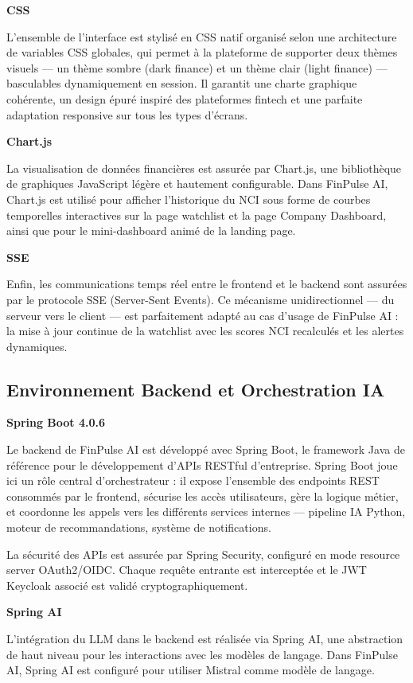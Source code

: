 \textbf{CSS}

L'ensemble de l'interface est stylisé en CSS natif organisé selon une architecture de variables CSS globales, qui permet à la plateforme de supporter deux thèmes visuels — un thème sombre (dark finance) et un thème clair (light finance) — basculables dynamiquement en session. Il garantit une charte graphique cohérente, un design épuré inspiré des plateformes fintech et une parfaite adaptation responsive sur tous les types d'écrans.

\textbf{Chart.js}

La visualisation de données financières est assurée par Chart.js, une bibliothèque de graphiques JavaScript légère et hautement configurable. Dans FinPulse AI, Chart.js est utilisé pour afficher l'historique du NCI sous forme de courbes temporelles interactives sur la page watchlist et la page Company Dashboard, ainsi que pour le mini-dashboard animé de la landing page.

\textbf{SSE}

Enfin, les communications temps réel entre le frontend et le backend sont assurées par le protocole SSE (Server-Sent Events). Ce mécanisme unidirectionnel — du serveur vers le client — est parfaitement adapté au cas d'usage de FinPulse AI : la mise à jour continue de la watchlist avec les scores NCI recalculés et les alertes dynamiques.

\subsection{Environnement Backend et Orchestration IA}

\textbf{Spring Boot 4.0.6}

Le backend de FinPulse AI est développé avec Spring Boot, le framework Java de référence pour le développement d'APIs RESTful d'entreprise. Spring Boot joue ici un rôle central d'orchestrateur : il expose l'ensemble des endpoints REST consommés par le frontend, sécurise les accès utilisateurs, gère la logique métier, et coordonne les appels vers les différents services internes — pipeline IA Python, moteur de recommandations, système de notifications.

La sécurité des APIs est assurée par Spring Security, configuré en mode resource server OAuth2/OIDC. Chaque requête entrante est interceptée et le JWT Keycloak associé est validé cryptographiquement.

\textbf{Spring AI}

L'intégration du LLM dans le backend est réalisée via Spring AI, une abstraction de haut niveau pour les interactions avec les modèles de langage. Dans FinPulse AI, Spring AI est configuré pour utiliser Mistral comme modèle de langage.

